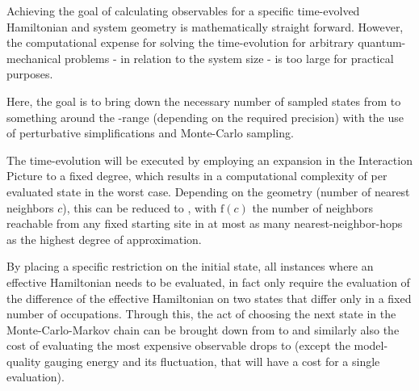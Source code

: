 Achieving the goal of calculating observables for a specific time-evolved Hamiltonian and system geometry is mathematically straight forward.
However, the computational expense for solving the time-evolution for arbitrary quantum-mechanical problems - in relation to the system size - is too large for practical purposes.

Here, the goal is to bring down the necessary number of sampled states from  to something around the -range (depending on the required precision) with the use of perturbative simplifications and Monte-Carlo sampling. 

The time-evolution will be executed by employing an expansion in the Interaction Picture to a fixed degree, which results in a computational complexity of  per evaluated state in the worst case.
Depending on the geometry (number of nearest neighbors $c$), this can be reduced to , with $\mathrm{f}(c)$ the number of neighbors reachable from any fixed starting site in at most as many nearest-neighbor-hops as the highest degree of approximation.

By placing a specific restriction on the initial state, all instances where an effective Hamiltonian needs to be evaluated, in fact only require the evaluation of the difference of the effective Hamiltonian on two states that differ only in a fixed number of occupations.
Through this, the act of choosing the next state in the Monte-Carlo-Markov chain can be brought down from  to  and similarly also the cost of evaluating the most expensive observable drops to  (except the model-quality gauging energy and its fluctuation, that will have a cost  for a single evaluation).
